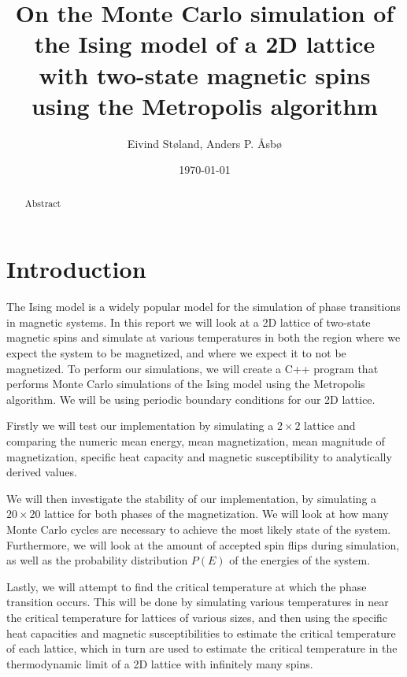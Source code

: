 \documentclass[reprint,english,notitlepage]{revtex4-1}  %
\begin{document}
\title{On the Monte Carlo simulation of the Ising model of a 2D lattice with two-state magnetic spins using the Metropolis algorithm}   %
\author{Eivind Støland, Anders P. Åsbø}               %
\date{\today}                             %
\noaffiliation                            %

\begin{abstract}
Abstract
\end{abstract}

\maketitle                                %


\tableofcontents

\section{Introduction} \label{sec:I}

The Ising model is a widely popular model for the simulation of phase transitions in magnetic systems. In this report we will look at a 2D lattice of two-state magnetic spins and simulate at various temperatures in both the region where we expect the system to be magnetized, and where we expect it to not be magnetized. To perform our simulations, we will create a C++ program that performs Monte Carlo simulations of the Ising model using the Metropolis algorithm. We will be using periodic boundary conditions for our 2D lattice.

Firstly we will test our implementation by simulating a \(2\times 2\) lattice and comparing the numeric mean energy, mean magnetization, mean magnitude of magnetization, specific heat capacity and magnetic susceptibility to analytically derived values.

We will then investigate the stability of our implementation, by simulating a \(20\times 20\) lattice for both phases of the magnetization. We will look at how many Monte Carlo cycles are necessary to achieve the most likely state of the system. Furthermore, we will look at the amount of accepted spin flips during simulation, as well as the probability distribution \(P(E)\) of the energies of the system.

Lastly, we will attempt to find the critical temperature at which the phase transition occurs. This will be done by simulating various temperatures in near the critical temperature for lattices of various sizes, and then using the specific heat capacities and magnetic susceptibilities to estimate the critical temperature of each lattice, which in turn are used to estimate the critical temperature in the thermodynamic limit of a 2D lattice with infinitely many spins.
\end{document}
